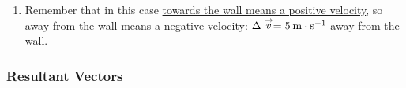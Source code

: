 {\begin{mdframed}[linewidth=4, leftmargin=40, rightmargin=40]
\begin{exercise}
\begin{enumerate}[noitemsep, label=\textbf{Step} \textbf{\arabic*}. ]
          
          \item  
          \label{m38816*id191279}Remember that in this case \uline{towards the wall means a positive velocity}, so \uline{away from the wall means a negative velocity}:
\begin{math}\Delta \stackrel{\to }{v}=5\phantom{\rule{2pt}{0ex}}\mathrm{m}\ensuremath{\cdot}{\mathrm{s}}^{-1}\end{math} away from the wall. \par 
          \end{enumerate}
         

    \end{exercise}
    \end{mdframed}
    }
    \noindent
  
\label{m38816*secfhsst!!!underscore!!!id1424}
            \subsubsection{  Resultant Vectors }
            \nopagebreak
            
